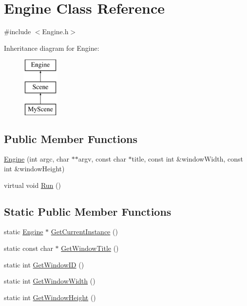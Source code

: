 \hypertarget{class_engine}{}\section{Engine Class Reference}
\label{class_engine}


{\ttfamily \#include $<$Engine.\+h$>$}

Inheritance diagram for Engine\+:\begin{figure}[H]
\begin{center}
\leavevmode
\includegraphics[height=3.000000cm]{class_engine}
\end{center}
\end{figure}
\subsection*{Public Member Functions}
\begin{DoxyCompactItemize}
\item 
\hyperlink{class_engine_a06d6fce9529416545e9b88edf5128358}{Engine} (int argc, char $\ast$$\ast$argv, const char $\ast$title, const int \&window\+Width, const int \&window\+Height)
\item 
virtual void \hyperlink{class_engine_af4c789fb939a0870426c698a5124a0ee}{Run} ()
\end{DoxyCompactItemize}
\subsection*{Static Public Member Functions}
\begin{DoxyCompactItemize}
\item 
static \hyperlink{class_engine}{Engine} $\ast$ \hyperlink{class_engine_ae9f9fcca9bc01336382a0d49fed6d160}{Get\+Current\+Instance} ()
\item 
static const char $\ast$ \hyperlink{class_engine_ae87b850ce1f35b1b19bdefa0bfc598a8}{Get\+Window\+Title} ()
\item 
static int \hyperlink{class_engine_ae7020ad5026116cbbc1d89a67c41a5af}{Get\+Window\+ID} ()
\item 
static int \hyperlink{class_engine_afe21f271a38196c447d364a68c3ba00a}{Get\+Window\+Width} ()
\item 
static int \hyperlink{class_engine_af3d49b062bf02821155f5e5b563c245d}{Get\+Window\+Height} ()
\end{DoxyCompactItemize}
